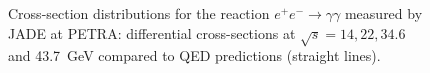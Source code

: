 \documentclass[a4paper,10pt]{article}
\begin{document}
\begin{figure}[htb]
\begin{center}
\caption{Cross-section distributions for the reaction $e^+e^-\rightarrow \gamma\gamma$ measured
by JADE at PETRA: differential cross-sections at $\sqrt{s} = 14, 22, 34.6$ and 43.7~GeV compared
to QED predictions (straight lines).}
\end{center}
\end{figure}
%
\end{document}
